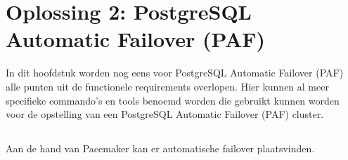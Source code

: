 
\chapter{Oplossing 2: PostgreSQL Automatic Failover (PAF)}
\label{ch:Oplossing 2: PostgreSQL Automatic Failover}

In dit hoofdstuk worden nog eens voor PostgreSQL Automatic Failover (PAF) alle punten uit de functionele requirements overlopen. Hier kunnen al meer specifieke commando's en tools benoemd worden die gebruikt kunnen worden voor de opstelling van een PostgreSQL Automatic Failover (PAF) cluster.


\section{}
\label{sec:Redundantie/Replicatie}

\section{}
\label{sec:Failover}

Aan de hand van Pacemaker kan er automatische failover plaatsvinden.

\section{}
\label{sec:Monitoring}


